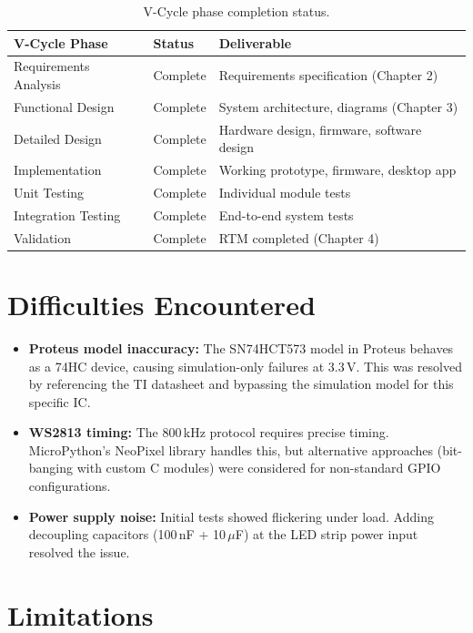 \begin{table}[H]
  \centering
  \caption{V-Cycle phase completion status.}
  \label{tab:vcycle-status}
  \begin{tabular}{p{4cm} p{3cm} p{5cm}}
    \toprule
    \textbf{V-Cycle Phase} & \textbf{Status} & \textbf{Deliverable} \\
    \midrule
    Requirements Analysis & Complete & Requirements specification (Chapter 2) \\
    Functional Design & Complete & System architecture, diagrams (Chapter 3) \\
    Detailed Design & Complete & Hardware design, firmware, software design \\
    Implementation & Complete & Working prototype, firmware, desktop app \\
    Unit Testing & Complete & Individual module tests \\
    Integration Testing & Complete & End-to-end system tests \\
    Validation & Complete & RTM completed (Chapter 4) \\
    \bottomrule
  \end{tabular}
\end{table}

\section{Difficulties Encountered}
\label{sec:difficulties}

\begin{itemize}
  \item \textbf{Proteus model inaccuracy:} The SN74HCT573 model in Proteus behaves as a 74HC device, causing simulation-only failures at 3.3\,V. This was resolved by referencing the TI datasheet and bypassing the simulation model for this specific IC.
  \item \textbf{WS2813 timing:} The 800\,kHz protocol requires precise timing. MicroPython's NeoPixel library handles this, but alternative approaches (bit-banging with custom C modules) were considered for non-standard GPIO configurations.
  \item \textbf{Power supply noise:} Initial tests showed flickering under load. Adding decoupling capacitors (100\,nF + 10\,$\mu$F) at the LED strip power input resolved the issue.
\end{itemize}

\section{Limitations}
\label{sec:limitations}


